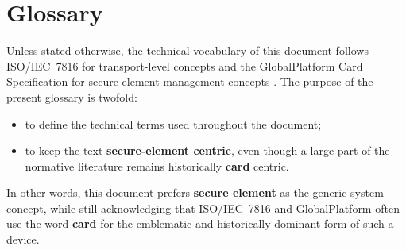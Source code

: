 \section{Glossary}

Unless stated otherwise, the technical vocabulary of this document follows
ISO/IEC~7816 for transport-level concepts and the GlobalPlatform Card
Specification for secure-element-management concepts 
. The purpose of the present glossary is
twofold:
\begin{itemize}
\item to define the technical terms used throughout the document;
\item to keep the text \textbf{secure-element centric}, even though a large
  part of the normative literature remains historically \textbf{card}
  centric.
\end{itemize}

In other words, this document prefers \textbf{secure element} as the generic
system concept, while still acknowledging that ISO/IEC~7816 and
GlobalPlatform often use the word \textbf{card} for the emblematic and
historically dominant form of such a device.

